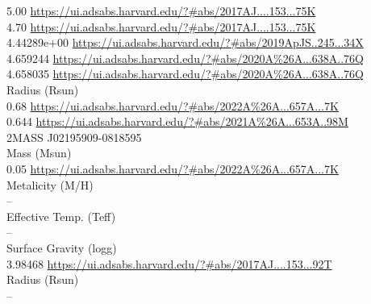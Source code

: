 5.00 \url{https://ui.adsabs.harvard.edu/?#abs/2017AJ....153...75K}\\
4.70 \url{https://ui.adsabs.harvard.edu/?#abs/2017AJ....153...75K}\\
4.44289e+00 \url{https://ui.adsabs.harvard.edu/?#abs/2019ApJS..245...34X}\\
4.659244 \url{https://ui.adsabs.harvard.edu/?#abs/2020A%26A...638A..76Q}\\
4.658035 \url{https://ui.adsabs.harvard.edu/?#abs/2020A%26A...638A..76Q}\\
Radius (Rsun)\\
0.68 \url{https://ui.adsabs.harvard.edu/?#abs/2022A%26A...657A...7K}\\
0.644 \url{https://ui.adsabs.harvard.edu/?#abs/2021A%26A...653A..98M}\\


2MASS J02195909-0818595\\
Mass (Msun)\\
0.05 \url{https://ui.adsabs.harvard.edu/?#abs/2022A%26A...657A...7K}\\
Metalicity (M/H)\\
--\\
Effective Temp. (Teff)\\
--\\
Surface Gravity (logg)\\
3.98468 \url{https://ui.adsabs.harvard.edu/?#abs/2017AJ....153...92T}\\
Radius (Rsun)\\
--\\